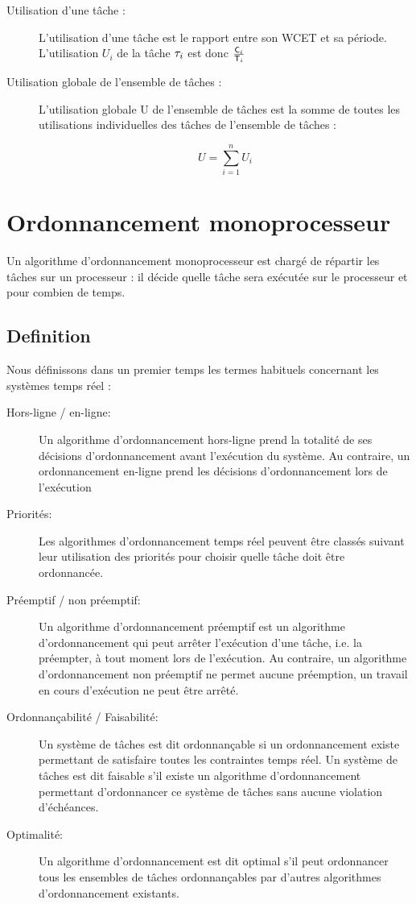 \begin{description}
\item[Utilisation d’une tâche :] L’utilisation d’une tâche est le
  rapport entre son WCET et sa période. L’utilisation $U_i$ de la
  t\^ache $\tau_{i}$ est donc
  $\frac{\mathsf{C}_{i}}{\mathsf{T}_{i}}$
\item[Utilisation globale de l’ensemble de tâches :] L’utilisation
  globale U de l’ensemble de tâches est la somme de toutes les
  utilisations individuelles des tâches de l’ensemble de tâches :

\begin{equation}
U = \sum_{i=1}^n U_i
\end{equation}

\end{description}

\section{Ordonnancement monoprocesseur}
Un algorithme d’ordonnancement monoprocesseur est chargé
de répartir les tâches sur un processeur : il décide quelle tâche sera
exécutée sur le processeur et pour combien de temps.
\subsection*{Definition}
Nous définissons dans un premier temps les termes
habituels concernant les systèmes temps réel : \\
\begin{description}
\item[Hors-ligne / en-ligne:] Un algorithme d’ordonnancement
  hors-ligne prend la totalité de ses décisions d’ordonnancement avant
  l’exécution du système. Au contraire, un ordonnancement en-ligne
  prend les décisions d’ordonnancement lors de l’exécution
\item[Priorités:] Les algorithmes d’ordonnancement temps réel peuvent
  être classés suivant leur utilisation des priorités pour choisir
  quelle tâche doit être ordonnancée.
\item[Préemptif / non préemptif:] Un algorithme d’ordonnancement
  préemptif est un algorithme d’ordonnancement qui peut arrêter
  l’exécution d’une tâche, i.e. la préempter, à tout moment lors de
  l’exécution. Au contraire, un algorithme d’ordonnancement non
  préemptif ne permet aucune préemption, un travail en cours
  d’exécution ne peut être arrêté.
\item[Ordonnançabilité / Faisabilité:] Un système de tâches est dit
  ordonnançable si un ordonnancement existe permettant de satisfaire
  toutes les contraintes temps réel. Un système de tâches est dit
  faisable s’il existe un algorithme d’ordonnancement permettant
  d’ordonnancer ce système de tâches sans aucune violation
  d’échéances.
\item[Optimalité:] Un algorithme d’ordonnancement est dit optimal s’il
  peut ordonnancer tous les ensembles de tâches ordonnançables par
  d’autres algorithmes d’ordonnancement existants.
\end{description}
